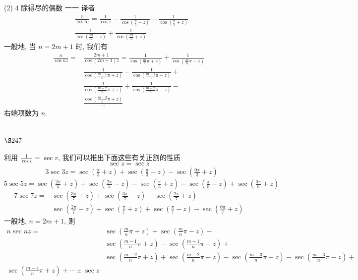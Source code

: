 (2) 4 除得尽的偶数 一一 译者. 
\[
\begin{aligned}
& \frac{5}{\cos 5 z}= \frac{1}{\cos z}-\frac{1}{\cos \left(\frac{\pi}{5}-z\right)}-\frac{1}{\cos \left(\frac{\pi}{5}+z\right)} \\
& \frac{1}{\cos \left(\frac{2 \pi}{5}-z\right)}+\frac{1}{\cos \left(\frac{2 \pi}{5}+z\right)}
\end{aligned}
\]
一般地, 当 $n=2 m+1$ 时, 我们有
\[
\begin{aligned}
\frac{n}{\cos n z}= & \frac{2 m+1}{\cos (2 m+1) z}=\frac{1}{\cos \left(\frac{m}{n} \pi+z\right)}+\frac{1}{\cos \left(\frac{m}{n} \pi-z\right)} \\
& \frac{1}{\cos \left(\frac{m-1}{n} \pi+z\right)}-\frac{1}{\cos \left(\frac{m-1}{n} \pi-z\right)}+ \\
& \frac{1}{\cos \left(\frac{m-2}{n} \pi+z\right)}+\frac{1}{\cos \left(\frac{m-2}{n} \pi-z\right)}- \\
& \frac{\cos \left(\frac{m-3}{n} \pi+z\right)}{\cdots}
\end{aligned}
\]
右端项数为 $n$.

\section{$\S 247$}

利用 $\frac{1}{\cos v}=\sec v$, 我们可以推出下面这些有关正割的性质
\[
\sec z=\sec z
\]
\[
\begin{aligned}
& 3 \sec 3 z=\sec \left(\frac{\pi}{3}+z\right)+\sec \left(\frac{\pi}{3}-z\right)-\sec \left(\frac{0 \pi}{3}+z\right)
\end{aligned}
\]
$5 \sec 5 z=\sec \left(\frac{2 \pi}{5}+z\right)+\sec \left(\frac{2 \pi}{5}-z\right)-\sec \left(\frac{\pi}{5}+z\right)-\sec \left(\frac{\pi}{5}-z\right)+\sec \left(\frac{0 \pi}{5}+z\right)$
\[
\begin{aligned}
7 \sec 7 z= & \sec \left(\frac{3 \pi}{7}+z\right)+\sec \left(\frac{3 \pi}{7}-z\right)-\sec \left(\frac{2 \pi}{7}+z\right)- \\
& \sec \left(\frac{2 \pi}{7}-z\right)+\sec \left(\frac{\pi}{7}+z\right)+\sec \left(\frac{\pi}{7}-z\right)-\sec \left(\frac{0 \pi}{7}+z\right)
\end{aligned}
\]
一般地, $n=2 m+1$, 则
\[
\begin{aligned}
n \sec n z= & \sec \left(\frac{m}{n} \pi+z\right)+\sec \left(\frac{m}{n} \pi-z\right)- \\
& \sec \left(\frac{m-1}{n} \pi+z\right)-\sec \left(\frac{m-1}{n} \pi-z\right)+ \\
& \sec \left(\frac{m-2}{n} \pi+z\right)+\sec \left(\frac{m-2}{n} \pi-z\right)-
\sec \left(\frac{m-3}{n} \pi+z\right)-\sec \left(\frac{m-3}{n} \pi-z\right)+ \\
\sec \left(\frac{m-4}{n} \pi+z\right)+\cdots \pm \sec z 
\end{aligned}
\]
